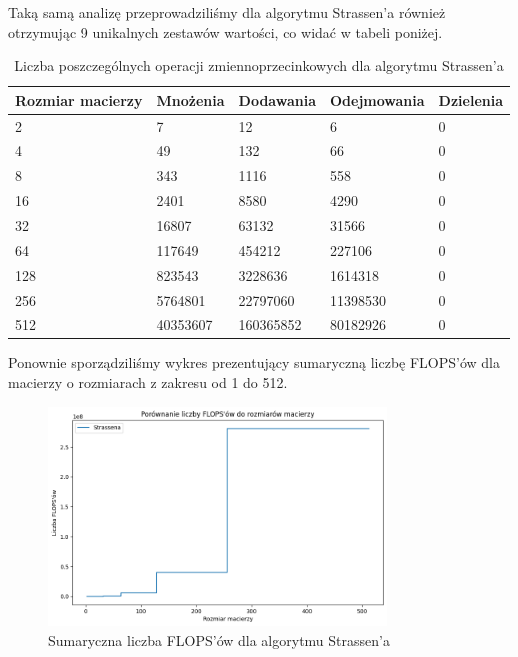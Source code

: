 \documentclass{article}
\begin{document}
Taką samą analizę przeprowadziliśmy dla algorytmu Strassen'a również otrzymując 9 unikalnych zestawów wartości, co widać w tabeli poniżej.

\begin{table}[H]
    \centering
    \begin{tabular}{|l|l|l|l|l|}
    \hline
        Rozmiar macierzy & Mnożenia & Dodawania & Odejmowania & Dzielenia  \\ \hline
        2 & 7 & 12 & 6 & 0  \\ \hline
        4 & 49 & 132 & 66 & 0  \\ \hline
        8 & 343 & 1116 & 558 & 0  \\ \hline
        16 & 2401 & 8580 & 4290 & 0  \\ \hline
        32 & 16807 & 63132 & 31566 & 0  \\ \hline
        64 & 117649 & 454212 & 227106 & 0  \\ \hline
        128 & 823543 & 3228636 & 1614318 & 0  \\ \hline
        256 & 5764801 & 22797060 & 11398530 & 0  \\ \hline
        512 & 40353607 & 160365852 & 80182926 & 0 \\ \hline
    \end{tabular}
    \caption{Liczba poszczególnych operacji zmiennoprzecinkowych dla algorytmu Strassen'a}
\end{table}

\noindent
Ponownie sporządziliśmy wykres prezentujący sumaryczną liczbę FLOPS'ów dla macierzy o rozmiarach z zakresu od 1 do 512.

\begin{figure}[H]
  \centering
    \includegraphics[width=0.8\textwidth]{images/strassen_flops.png}
  \caption{Sumaryczna liczba FLOPS'ów dla algorytmu Strassen'a}
\end{figure}
\end{document}
